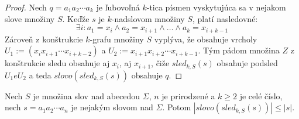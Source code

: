 \begin{proof}
    Nech $q = a_1 a_2 \cdots a_k$ je ľubovoľná $k$-tica písmen vyskytujúca sa v nejakom slove množiny $S$.
    Keďže $s$ je $k$-nadslovom množiny $S$, platí nasledovné: 
    $$\exists i : a_1 = x_i \wedge a_2 = x_{i+1} \wedge \ldots \wedge a_k = x_{i+k-1}$$
    Zároveň z konštrukcie $k$-grafu množiny $S$ vyplýva, že obsahuje vrcholy $U_1 := (x_i x_{i+1} \cdots x_{i+k-2})$
    a $U_2 := x_{i+1} x_{i+2} \cdots x_{i+k-1}$. Tým pádom množina $Z$ z konštrukcie sledu obsahuje aj $x_i$, aj
    $x_{i+1}$, čiže $sled_{k,S}(s)$ obsahuje podsled $U_1 e U_2$ a teda $slovo (sled_{k,S}(s))$ obsahuje $q$.
\end{proof}

\begin{veta}
    Nech $S$ je množina slov nad abecedou $\Sigma$, $n$ je prirodzené a $k \ge 2$ je celé číslo, nech $s = a_1 a_2 \cdots a_n$ je
    nejakým slovom nad $\Sigma$. Potom $|slovo(sled_{k,S}(s))| \leq |s|.$
\end{veta}

